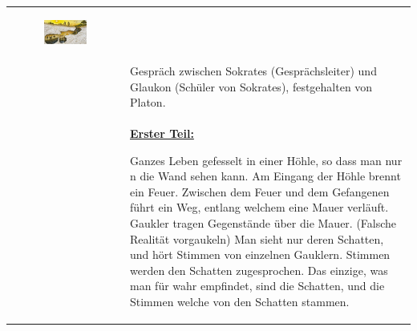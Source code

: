 \begin{longtable}{>{\bfseries}p{}p{}}
						\begin{minipage}{0.75\textwidth}
							\begin{figure}[H]\centering
								\includegraphics[scale=0.4]{./pictures/hoehlengleichnis.jpeg}
							\end{figure}
						\end{minipage}\\
					& Gespräch zwischen Sokrates (Gesprächsleiter) und Glaukon (Schüler von Sokrates), festgehalten von Platon.\\
					& \textbf{\underline{Erster Teil:}}\newline
						
						Ganzes Leben gefesselt in einer Höhle, so dass man nur n die Wand sehen kann.\newline
						Am Eingang der Höhle brennt ein Feuer.
						Zwischen dem Feuer und dem Gefangenen führt ein Weg, entlang welchem eine Mauer verläuft.\newline
						Gaukler tragen Gegenstände über die Mauer. (Falsche Realität vorgaukeln)\newline
						Man sieht nur deren Schatten, und hört Stimmen von einzelnen Gauklern.\newline
						Stimmen werden den Schatten zugesprochen.\newline
						Das einzige, was man für wahr empfindet, sind die Schatten, und die Stimmen welche von den Schatten stammen.\newline
						

\end{longtable}
